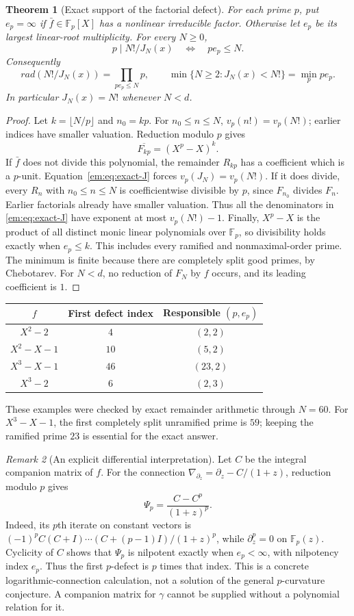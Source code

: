 \documentclass[11pt,a4paper]{article}
\newtheorem{theorem}{Theorem}[section]
\theoremstyle{definition}
\theoremstyle{remark}
\newtheorem{remark}[theorem]{Remark}
\theoremstyle{plain}
\numberwithin{equation}{section}
\def\operatorname#1{#1}\def\mathrm#1{#1}}
\begin{document}
\begin{theorem}[Exact support of the factorial defect]\label{em:thm:first-defect}
For each prime $p$, put $e_p=\infty$ if $\bar f\in\mathbb F_p[X]$
has a nonlinear irreducible factor.  Otherwise let $e_p$ be its largest
linear-root multiplicity.  For every $N\ge0$,
\[
 p\mid N!/J_N(x)\quad\Longleftrightarrow\quad p e_p\le N.
\]
Consequently
\[
\operatorname{rad}(N!/J_N(x))=\prod_{p e_p\le N}p,
\qquad
\min\{N\ge2:J_N(x)<N!\}=\min_p p e_p.
\]
In particular $J_N(x)=N!$ whenever $N<d$.
\end{theorem}
\begin{proof}
Let $k=\lfloor N/p\rfloor$ and $n_0=kp$.  For $n_0\le n\le N$,
$v_p(n!)=v_p(N!)$; earlier indices have smaller valuation.  Reduction
modulo $p$ gives
\[
 \overline{F_{kp}}=(X^p-X)^k.
\]
If $\bar f$ does not divide this polynomial, the remainder $R_{kp}$
has a coefficient which is a $p$-unit.  Equation~\eqref{em:eq:exact-J}
forces $v_p(J_N)=v_p(N!)$.  If it does divide, every $R_n$ with
$n_0\le n\le N$ is coefficientwise divisible by $p$, since $F_{n_0}$
divides $F_n$.  Earlier factorials already have smaller valuation.
Thus all the denominators in \eqref{em:eq:exact-J} have exponent at most
$v_p(N!)-1$.  Finally, $X^p-X$ is the product of all distinct monic
linear polynomials over $\mathbb F_p$, so divisibility holds exactly
when $e_p\le k$.  This includes every ramified and nonmaximal-order
prime.  The minimum is finite because there are completely split good
primes, by Chebotarev.  For $N<d$, no reduction of $F_N$ by $f$ occurs,
and its leading coefficient is $1$.
\end{proof}

\begin{center}
\begin{tabular}{c|c|c}
$f$ & First defect index & Responsible $(p,e_p)$\\\hline
$X^2-2$ & $4$ & $(2,2)$\\
$X^2-X-1$ & $10$ & $(5,2)$\\
$X^3-X-1$ & $46$ & $(23,2)$\\
$X^3-2$ & $6$ & $(2,3)$
\end{tabular}
\end{center}
These examples were checked by exact remainder arithmetic through
$N=60$.  For $X^3-X-1$, the first completely split unramified prime
is $59$; keeping the ramified prime $23$ is essential for the exact answer.

\begin{remark}[An explicit differential interpretation]\label{em:defect-curvature}
Let $C$ be the integral companion matrix of $f$.  For the connection
$\nabla_{\partial_z}=\partial_z-C/(1+z)$, reduction modulo $p$ gives
\[
 \Psi_p=\frac{C-C^p}{(1+z)^p}.
\]
Indeed, its $p$th iterate on constant vectors is
$(-1)^p C(C+I)\cdots(C+(p-1)I)/(1+z)^p$, while
$\partial_z^p=0$ on $\mathbb F_p(z)$.  Cyclicity of $C$ shows that
$\Psi_p$ is nilpotent exactly when $e_p<\infty$, with nilpotency
index $e_p$.  Thus the first $p$-defect is $p$ times that index.
This is a concrete logarithmic-connection calculation, not a solution
of the general $p$-curvature conjecture.  A companion matrix for
$\gamma$ cannot be supplied without a polynomial relation for it.
\end{remark}
\end{document}
